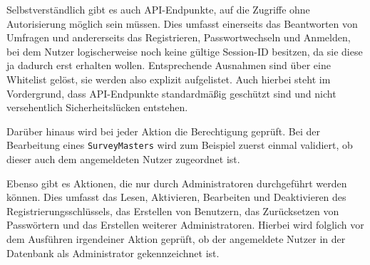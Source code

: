 Selbstverständlich gibt es auch \acs{API}-Endpunkte, auf die Zugriffe ohne Autorisierung möglich sein müssen.
Dies umfasst einerseits das Beantworten von Umfragen und andererseits das Registrieren, Passwortwechseln und Anmelden, bei dem Nutzer logischerweise noch keine gültige Session-ID besitzen, da sie diese ja dadurch erst erhalten wollen.
Entsprechende Ausnahmen sind über eine Whitelist gelöst, sie werden also explizit aufgelistet.
Auch hierbei steht im Vordergrund, dass \acs{API}-Endpunkte standardmäßig geschützt sind und nicht versehentlich Sicherheitslücken entstehen.

Darüber hinaus wird bei jeder Aktion die Berechtigung geprüft.
Bei der Bearbeitung eines \texttt{SurveyMasters} wird zum Beispiel zuerst einmal validiert, ob dieser auch dem angemeldeten Nutzer zugeordnet ist.

Ebenso gibt es Aktionen, die nur durch Administratoren durchgeführt werden können.
Dies umfasst das Lesen, Aktivieren, Bearbeiten und Deaktivieren des Registrierungsschlüssels, das Erstellen von Benutzern, das Zurücksetzen von Passwörtern und das Erstellen weiterer Administratoren.
Hierbei wird folglich vor dem Ausführen irgendeiner Aktion geprüft, ob der angemeldete Nutzer in der Datenbank als Administrator gekennzeichnet ist.
